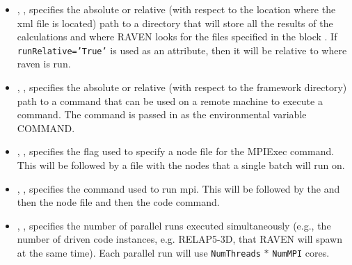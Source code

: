 \begin{itemize}
\item {}, ,
  specifies the absolute or relative (with respect to the location
  where the xml file is located) path to a directory that will store
  all the results of the calculations and where RAVEN looks for the
  files specified in the block .  If
  \texttt{runRelative='True'} is used as an attribute, then it will be
  relative to where raven is run.
%


\item {}, ,
  specifies the absolute or relative (with respect to the framework
  directory) path to a command that can be used on a remote machine to
  execute a command.  The command is passed in as the environmental
  variable COMMAND.
%


\item {}, ,
  specifies the flag used to specify a node file for the MPIExec command.  This will be followed by a file with the nodes that a single batch will run on.

\item {}, , specifies the command used to run mpi.  This will be followed by the  and then the node file and then the code command.

\item {}, ,
  specifies the number of parallel runs executed simultaneously (e.g.,
  the number of driven code instances, e.g. RELAP5-3D, that RAVEN will
  spawn at the same time).  Each parallel run will use
  \texttt{NumThreads} $*$ \texttt{NumMPI} cores.
%


\end{itemize}
